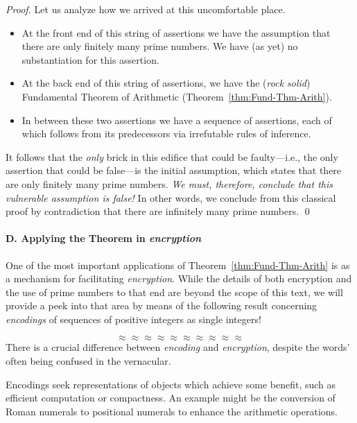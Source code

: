 \begin{proof}
Let us analyze how we arrived at this uncomfortable place.
\begin{itemize}
\item
At the front end of this string of assertions we have the assumption
that there are only finitely many prime numbers.  We have (as yet) no
substantiation for this assertion.
\item
At the back end of this string of assertions, we have the ({\em rock
  solid}) Fundamental Theorem of Arithmetic
(Theorem~\ref{thm:Fund-Thm-Arith}).
\item
In between these two assertions we have a sequence of assertions, each
of which follows from its predecessors via irrefutable rules of
inference.
\end{itemize}
It follows that the {\em only} brick in this edifice that could be
faulty---i.e., the only assertion that could be false---is the initial
assumption, which states that there are only finitely many prime
numbers.  {\em We must, therefore, conclude that this vulnerable
  assumption is false!}  In other words, we conclude from this
classical proof by contradiction that there are infinitely many prime
numbers.  \qed
\end{proof}


\paragraph{\small\sf D. Applying the Theorem in {\em encryption}}

One of the most important applications of Theorem~\ref{thm:Fund-Thm-Arith} is
as a mechanism for facilitating {\em encryption}.
%
While the details of both encryption and the use of prime numbers to
that end are beyond the scope of this text, we will provide a peek
into that area by means of the following result concerning {\it
  encodings} of sequences of positive integers as single integers!

\[ \approx \approx \approx \approx \approx \approx \approx \approx \approx \approx \]
There is a crucial difference between {\em encoding} and {\em
  encryption}, despite the words' often being confused in the
vernacular.

Encodings seek representations of objects which achieve some benefit,
such as efficient computation or compactness.  An example might be the
conversion of Roman numerals to positional numerals to enhance the
arithmetic operations.

